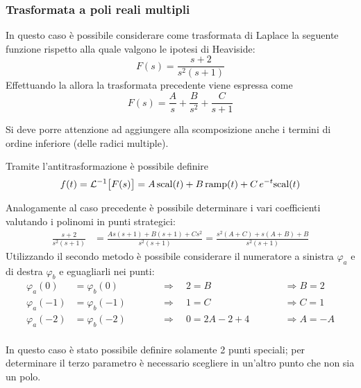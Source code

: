 		\subsubsection{Trasformata a poli reali multipli}
			In questo caso è possibile considerare come trasformata di Laplace la seguente funzione rispetto alla quale valgono le ipotesi di Heaviside:
			\[F(s) = \frac{s+2}{s^2(s+1)}\]
			Effettuando la  allora la trasformata precedente viene espressa come
			\[ F(s) = \frac A {s} + \frac{B}{s^2} + \frac{C}{s+1} \]
			\begin{nota}
				Si deve porre attenzione ad aggiungere alla scomposizione anche i termini di ordine inferiore (delle radici multiple).
			\end{nota}
			Tramite l'antitrasformazione è possibile definire
			\[ f(t) = \mathcal L^{-1} \big[F(s)\big] = A\, \textrm{scal}(t) + B\, \textrm{ramp}(t) + C \, e^{-t}\textrm{scal}(t) \]
			
			Analogamente al caso precedente è possibile determinare i vari coefficienti valutando i polinomi in punti strategici:
			\begin{align*}
				\frac{s+2}{s^2(s+1)} & = \frac{ As (s+1) + B(s+1) + Cs^2}{s^2(s+1)} = \frac{s^2(A+C) + s(A+B) + B}{s^2(s+1)}
			\end{align*}
			Utilizzando il secondo metodo è possibile considerare il numeratore a sinistra $\varphi_a$ e di destra $\varphi_b$ e eguagliarli nei punti:
			\begin{align*}
				\varphi_a(0) & =\varphi_b(0) \qquad &&\Rightarrow \quad 2= B \qquad &&\Rightarrow B = 2 \\
				\varphi_a(-1) & =\varphi_b(-1) \qquad &&\Rightarrow \quad 1 = C \qquad &&\Rightarrow C = 1 \\
				\varphi_a(-2) & =\varphi_b(-2) \qquad &&\Rightarrow \quad 0 = 2A - 2 +4 \qquad &&\Rightarrow A = -A \\
			\end{align*}
			\begin{nota}
				In questo caso è stato possibile definire solamente 2 punti speciali; per determinare il terzo parametro è necessario scegliere in un'altro punto che non sia un polo.
			\end{nota}
		
